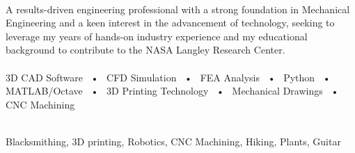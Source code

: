 \documentclass[allblack]{simplehipstercv}
\begin{document}
\begin{paracol}{2}


\paracolbackgroundoptions


\footnotesize
{\setasidefontcolour
\flushleft

\\[0.5em]

{\footnotesize
A results-driven engineering
professional with a strong
foundation in Mechanical Engineering
and a keen interest in the
advancement of technology,
seeking to leverage my years of
hands-on industry experience and
my educational background to
contribute to the NASA Langley Research Center.}\\
\bigskip
{} \\[0.5em]

3D CAD Software ~•~ CFD Simulation ~•~ FEA Analysis ~•~ Python ~•~ MATLAB/Octave ~•~ 3D Printing Technology ~•~ Mechanical Drawings ~•~ CNC Machining\\

\bigskip

\\[0.5em]

Blacksmithing, 3D printing, Robotics, CNC Machining,
Hiking, Plants, Guitar\\
\bigskip


\phantom{turn the page}
\phantom{turn the page}
}
\switchcolumn

\end{paracol}
\end{document}
